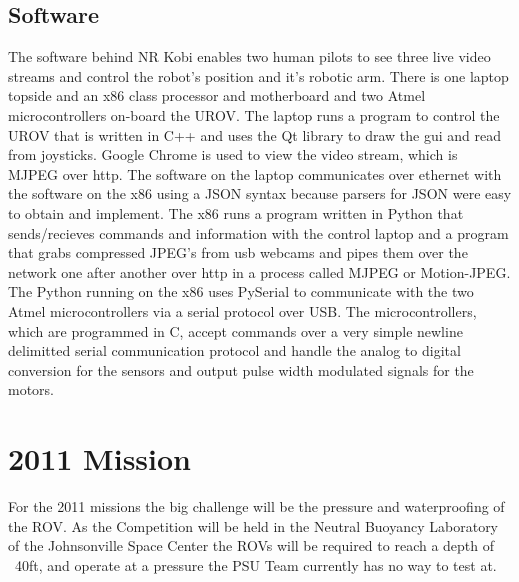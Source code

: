 \documentclass{proposalnsf}
\begin{document}
\subsection{Software}
The software behind NR Kobi enables two human pilots to see three live video streams and control the robot's position and it's robotic arm. There is one laptop topside and an x86 class processor and motherboard and two Atmel microcontrollers on-board the UROV. The laptop runs a program to control the UROV that is written in C++ and uses the Qt library to draw the gui and read from joysticks. Google Chrome is used to view the video stream, which is MJPEG over http. The software on the laptop communicates over ethernet with the software on the x86 using a JSON syntax because parsers for JSON were easy to obtain and implement. The x86 runs a program written in Python that sends/recieves commands and information with the control laptop and a program that grabs compressed JPEG's from usb webcams and pipes them over the network one after another over http in a process called MJPEG or Motion-JPEG. The Python running on the x86 uses PySerial to communicate with the two Atmel microcontrollers via a serial protocol over USB. The microcontrollers, which are programmed in C, accept commands over a very simple newline delimitted serial communication protocol and handle the analog to digital conversion for the sensors and output pulse width modulated signals for the motors. 



\newpage

\section{2011 Mission}
For the 2011 missions the big challenge will be the pressure and waterproofing of the ROV.  As the Competition will be held in the Neutral Buoyancy Laboratory of the Johnsonville Space Center
the ROVs will be required to reach a depth of ~40ft, and operate at a pressure the PSU Team currently has no way to test at.
\end{document}
